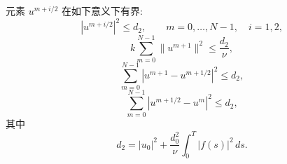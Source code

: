 \begin{Lemma}
\label{lem:ch3-projection-basic-estimates}
元素 $u^{m+i/2}$ 在如下意义下有界:
\begin{equation}
|u^{m+i/2}|^2\leq d_2,\qquad
m=0,\ldots,N-1,\quad i=1,2,
\label{eq:ch3-projection-basic-linfty}
\end{equation}
\begin{equation}
k\sum_{m=0}^{N-1}\lVert u^{m+1}\rVert^2\leq\frac{d_2}{\nu},
\label{eq:ch3-projection-basic-h1}
\end{equation}
\begin{equation}
\sum_{m=0}^{N-1}|u^{m+1}-u^{m+1/2}|^2\leq d_2,
\label{eq:ch3-projection-basic-projection-jumps}
\end{equation}
\begin{equation}
\sum_{m=0}^{N-1}|u^{m+1/2}-u^m|^2\leq d_2,
\label{eq:ch3-projection-basic-momentum-jumps}
\end{equation}
其中
\begin{equation}
d_2=|u_0|^2+\frac{d_0^2}{\nu}\int_0^T|f(s)|^2\,ds.
\label{eq:ch3-projection-basic-data-bound}
\end{equation}
\end{Lemma}

